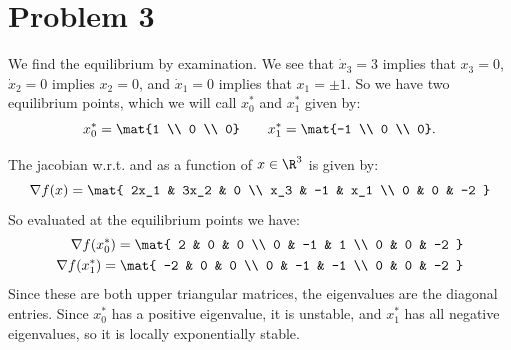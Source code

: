\documentclass{homework}
\begin{document}
\section{Problem 3}
\begin{letterenum}
\item We find the equilibrium by examination. We see that $\dot{x}_3 = 3$
implies that $x_3 = 0$, $\dot{x}_2=0$ implies $x_2 = 0$, and $\dot{x}_1 = 0$
implies that $x_1 = \pm1$. So we have two equilibrium points, which we 
will call $x_0^*$ and $x_1^*$ given by:
\begin{equation*}
    x_0^* = \mat{1 \\ 0 \\ 0} \qquad x_1^* = \mat{-1 \\ 0 \\ 0}.
\end{equation*}
\item The jacobian w.r.t. and as a function of $x\in\R^3$ is given by:
\begin{equation*}
    \nabla f(x) = \mat{
        2x_1 & 3x_2 & 0 \\
        x_3 & -1 & x_1 \\
        0 & 0 & -2
    }
\end{equation*}
So evaluated at the equilibrium points we have:
\begin{align*}
    \nabla f(x_0^*) = \mat{
        2 & 0 & 0 \\
        0 & -1 & 1 \\
        0 & 0 & -2
    } \\
    \nabla f(x_1^*) = \mat{
        -2 & 0 & 0 \\
        0 & -1 & -1 \\
        0 & 0 & -2
    }
\end{align*}
Since these are both upper triangular matrices, the eigenvalues
are the diagonal entries. Since $x_0^*$ has a positive eigenvalue,
it is unstable, and $x_1^*$ has all negative eigenvalues, so it
is locally exponentially stable.


\end{letterenum}
\end{document}
